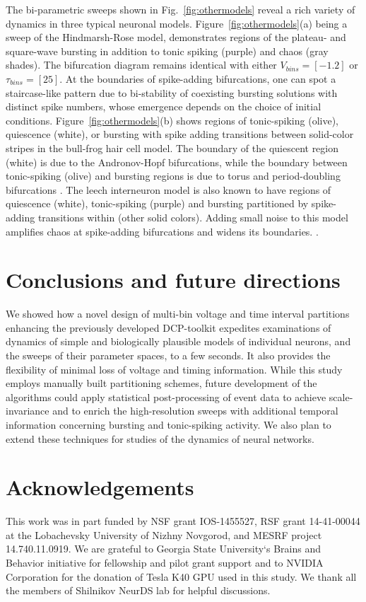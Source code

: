 \documentclass{ws-book9x6}
\begin{document}
The bi-parametric sweeps shown in Fig.~\ref{fig:othermodels}  reveal a rich variety of dynamics in three typical neuronal models. Figure~\ref{fig:othermodels}(a) being a sweep of the Hindmarsh-Rose model, demonstrates regions of the plateau-  and square-wave bursting in addition to tonic spiking (purple) and chaos (gray shades). The bifurcation diagram remains identical with either $V_{bins} = [-1.2]$ or $\tau_{bins} = [25]$. At the boundaries of spike-adding bifurcations, one can spot a staircase-like pattern due to bi-stability of coexisting bursting solutions with distinct spike numbers, whose emergence depends on the choice of initial conditions.
Figure~\ref{fig:othermodels}(b) shows regions of tonic-spiking (olive), quiescence (white), or bursting with spike adding transitions between solid-color stripes in the bull-frog hair cell model. The boundary of the quiescent region (white) is due to the Andronov-Hopf bifurcations, while the boundary between tonic-spiking (olive) and bursting regions is due to torus and period-doubling bifurcations \citep{ju2018}. 
The leech interneuron model is also known to have regions of quiescence (white), tonic-spiking (purple) and bursting partitioned by spike-adding transitions within (other solid colors). Adding small noise to this model amplifies chaos at spike-adding bifurcations and widens its boundaries. \cite{channell2009}.  

\section{Conclusions and future directions}
We showed how a novel design of multi-bin voltage and time interval partitions enhancing the previously developed DCP-toolkit expedites examinations of dynamics of simple and biologically plausible models of individual neurons, and the sweeps of their parameter spaces, to a few seconds. It also provides the flexibility of minimal loss of voltage and timing information.  While this study employs manually built partitioning schemes, future development of the algorithms could apply statistical post-processing of event data to achieve scale-invariance and to enrich the high-resolution sweeps with additional temporal information concerning bursting and tonic-spiking activity. We also plan to extend these techniques for studies of the dynamics of neural networks. 

\section*{Acknowledgements}
This work was in part funded by NSF grant IOS-1455527, RSF grant 14-41-00044 at the Lobachevsky University of Nizhny Novgorod, and MESRF project 14.740.11.0919. We are grateful to Georgia State University`s Brains and Behavior initiative for fellowship and pilot grant support and to NVIDIA Corporation for the donation of Tesla K40 GPU used in this study. We thank all the members of Shilnikov NeurDS lab for helpful discussions.
\end{document}
